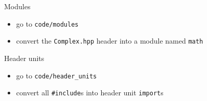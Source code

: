 \begin{frame}[fragile]
  \begin{exercise}{Modules}
    \begin{itemize}
      \item go to \texttt{code/modules}
      \item convert the \texttt{Complex.hpp} header into a module named \texttt{math}
    \end{itemize}
  \end{exercise}
  \begin{exercise}{Header units}
    \begin{itemize}
      \item go to \texttt{code/header\_units}
      \item convert all \texttt{#include}s into header unit \texttt{import}s
    \end{itemize}
  \end{exercise}
\end{frame}
